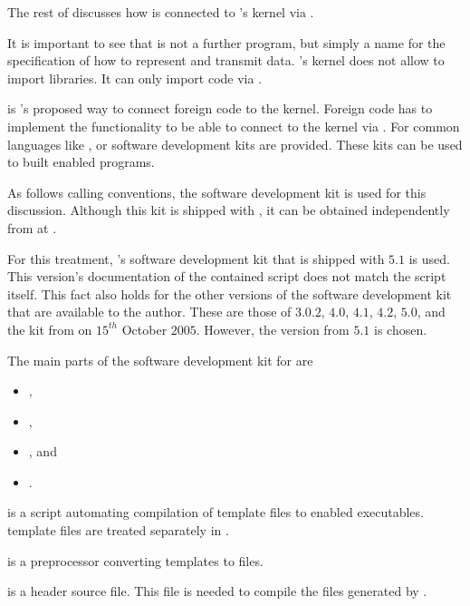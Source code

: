 The rest of  discusses how \exportedsymbol is connected to \Mathematica's kernel via \MathLink.

It is important to see that \MathLink is not a further program, but simply a name for the specification of how to represent and transmit data. \Mathematica's kernel does not allow to import libraries. It can only import code via \MathLink.

\MathLink is \Mathematica's proposed way to connect foreign code to the \Mathematica kernel. Foreign code has to implement the \MathLink functionality to be able to connect to the kernel via \MathLink. For common languages like \C, or \Java software development kits are provided. These kits can be used to built \MathLink enabled programs.

As \exportedsymbol follows \C calling conventions, the \C software development kit is used for this discussion. Although this kit is shipped with \Mathematica, it can be obtained independently from \Mathematica at \cite{MathLinkSDK}.

For this treatment, \MathLink's \C software development kit that is shipped with \Mathematica $5.1$ is used. This version's documentation of the contained \Mcc script does not match the \Mcc script itself. This fact also holds for the other versions of the software development kit that are available to the author. These are those of \Mathematica $3.0.2$, \Mathematica $4.0$, \Mathematica $4.1$, \Mathematica $4.2$, \Mathematica $5.0$, and the kit from \cite{MathLinkSDK} on $15^{th}$ October $2005$. However, the version from \Mathematica $5.1$ is chosen.

The main parts of the \C software development kit for \Mathematica are
\begin{itemize}
\item \Mcc,
\item \Mprep,
\item {}, and
\item {}.
\end{itemize}

\Mcc is a script automating compilation of \MathLink template files to \MathLink enabled executables. \MathLink template files are treated separately in .

\Mprep is a preprocessor converting \MathLink templates to \C files.

 is a \C header source file. This file is needed to compile the \C files generated by \Mprep.

